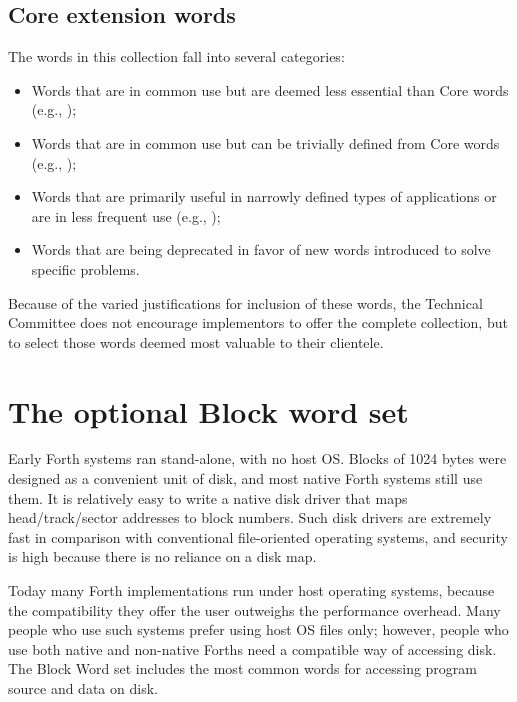 
\setcounter{subsection}{1}
\subsection{Core extension words} %
\label{rat:core-ext}

The words in this collection fall into several categories:

\begin{itemize}
\item Words that are in common use but are deemed less essential than
	Core words (e.g., );

\item Words that are in common use but can be trivially defined from
	Core words (e.g., );

\item Words that are primarily useful in narrowly defined types of
	applications or are in less frequent use (e.g., );

\item Words that are being deprecated in favor of new words introduced
	to solve specific problems.
\end{itemize}

Because of the varied justifications for inclusion of these words,
the Technical Committee does not encourage implementors to offer the
complete collection, but to select those words deemed most valuable to
their clientele.



\section{The optional Block word set} %
\label{rat:block}

Early Forth systems ran stand-alone, with no host OS. Blocks of 1024
bytes were designed as a convenient unit of disk, and most native
Forth systems still use them. It is relatively easy to write a native
disk driver that maps head/track/sector addresses to block numbers.
Such disk drivers are extremely fast in comparison with conventional
file-oriented operating systems, and security is high because there is
no reliance on a disk map.

Today many Forth implementations run under host operating systems,
because the compatibility they offer the user outweighs the performance
overhead. Many people who use such systems prefer using host OS files
only; however, people who use both native and non-native Forths need a
compatible way of accessing disk. The Block Word set includes the most
common words for accessing program source and data on disk.

